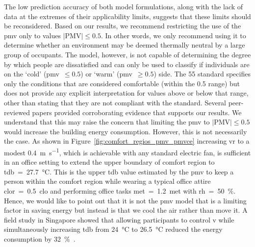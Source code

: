 The low prediction accuracy of both model formulations, along with the lack of data at the extremes of their applicability limits, suggests that these limits should be reconsidered.
Based on our results, we recommend restricting the use of the \ac{pmv} only to values $\lvert \textrm{PMV}\lvert \leq 0.5$.
In other words, we only recommend using it to determine whether an environment may be deemed thermally neutral by a large group of occupants.
The model, however, is not capable of determining the degree by which people are dissatisfied and can only be used to classify if individuals are on the `cold' (\ac{pmv}~$\leq 0.5$) or `warm' (\ac{pmv}~$\geq 0.5$) side.
The \gls{55} standard specifies only the conditions that are considered comfortable (within the 0.5 range) but does not provide any explicit interpretation for values above or below that range, other than stating that they are not compliant with the standard.
Several peer-reviewed papers \cite{Cheung2019, Yao2022, kim2019thermal, tartarini2018thermal, Humphreys2002, doherty_evaluation_1988} provided corroborating evidence that supports our results.
We understand that this may raise the concern that limiting the \ac{pmv} to $\lvert \textrm{PMV}\lvert \leq 0.5$ would increase the building energy consumption. 
However, this is not necessarily the case.
As shown in Figure~\ref{fig:comfort_regios_pmv_pmvce} increasing \ac{vr} to a modest \qty{0.4}{\m\per\s}, which is achievable with any standard electric fan, is sufficient in an office setting to extend the upper boundary of comfort region to \ac{tdb}~=~\qty{27.7}{\celsius}.
This is the upper \ac{tdb} value estimated by the \ac{pmv} to keep a person within the comfort region while wearing a typical office attire \ac{clor}~=~\qty{0.5}{clo} and performing office tasks \ac{met}~=~\qty{1.2}{met} with \ac{rh}~=~\qty{50}{\percent}.
Hence, we would like to point out that it is not the \ac{pmv} model that is a limiting factor in saving energy but instead is that we cool the air rather than move it.
A field study in Singapore showed that allowing participants to control \ac{v} while simultaneously increasing \ac{tdb} from \qty{24}{\celsius} to \qty{26.5}{\celsius} reduced the energy consumption by \qty{32}{\percent}~\cite{kent_energy_2023}.

